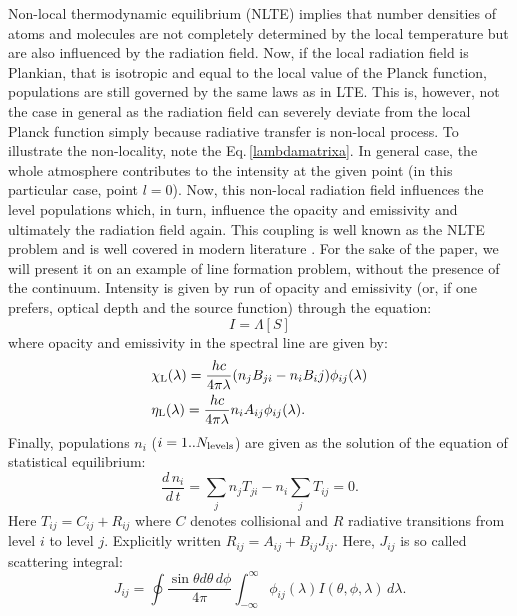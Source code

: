 \documentclass[referee]{aa}
\begin{document}
Non-local thermodynamic equilibrium (NLTE) implies that number densities of atoms and molecules are not completely determined by the local temperature but are also influenced by the radiation field. Now, if the local radiation field is Plankian, that is isotropic and equal to the local value of the Planck function, populations are still governed by the same laws as in LTE. This is, however, not the case in general as the radiation field can severely deviate from the local Planck function simply because radiative transfer is non-local process. To illustrate the non-locality, note the Eq.\,\ref{lambdamatrixa}. In general case, the whole atmosphere contributes to the intensity at the given point (in this particular case, point $l=0$). Now, this non-local radiation field influences the level populations which, in turn, influence the opacity and emissivity and ultimately the radiation field again. This coupling is well known as the NLTE problem and is well covered in modern literature \citep[probably the most thorough and well known is monograph by][]{Mihalasbook}. For the sake of the paper, we will present it on an example of line formation problem, without the presence of the continuum. Intensity is given by run of opacity and emissivity (or, if one prefers, optical depth and the source function) through the equation:
\begin{equation}
 I = \Lambda[S]
\end{equation}
where opacity and emissivity in the spectral line are given by:
\begin{align}
 &\chi_{\rm L}(\lambda) = \frac{hc}{4\pi\lambda} (n_j B_{ji}- n_i{B_ij}) \phi_{ij} (\lambda)\\
 &\eta_{\rm L}(\lambda) = \frac{hc}{4\pi\lambda} n_i A_{ij} \phi_{ij} (\lambda).
\end{align}
Finally, populations $n_i$ ($i=1..N_{\rm levels}$) are given as the solution of the equation of statistical equilibrium:
\begin{equation}
 \frac{d\,n_i}{d\,t} = \sum_j n_j T_{ji} - n_i \sum_j T_{ij} = 0.
 \label{SE}
\end{equation}
Here $T_{ij} = C_{ij} + R_{ij}$ where $C$ denotes collisional and $R$ radiative transitions from level $i$ to level $j$. Explicitly written $R_{ij} = A_{ij} + B_{ij} J_{ij}$. Here, $J_{ij}$ is so called scattering integral:
\begin{equation}
 J_{ij} = \oint \frac{\sin \theta d\theta\,d\phi}{4\pi} \int_{-\infty}^{\infty} \phi_{ij}(\lambda) I(\theta,\phi,\lambda)\,d\lambda.
\end{equation}
\end{document}
